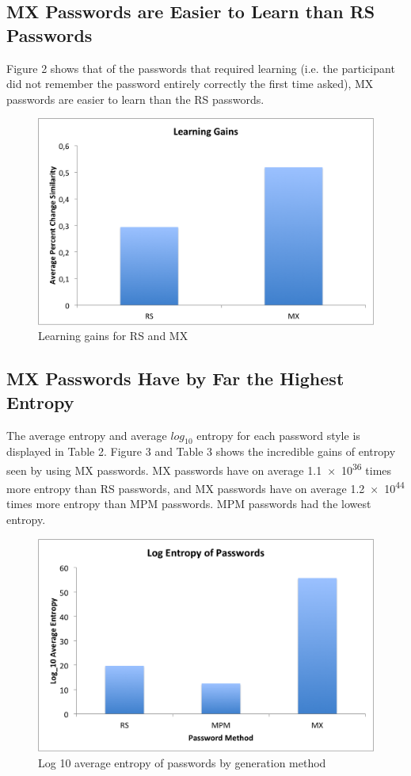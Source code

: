 \documentclass{article}
\begin{document}
\subsection*{MX Passwords are Easier to Learn than RS Passwords}
Figure 2 shows that of the passwords that required learning (i.e. the participant did not remember the password entirely correctly the first time asked), MX passwords are easier to learn than the RS passwords. 
\begin{figure}[h]
\centering
\includegraphics[scale=0.7]{learningGains.png}
\caption{Learning gains for RS and MX}
\end{figure}

\subsection*{MX Passwords Have by Far the Highest Entropy}
The average  entropy and average $log_{10}$ entropy for each password style is displayed in Table 2. Figure 3 and Table 3 shows the incredible gains of entropy seen by using MX passwords. MX passwords have on average \num{1.1e36} times more entropy than RS passwords, and MX passwords have on average \num{1.2e44} times more entropy than MPM passwords. MPM passwords had the lowest entropy. 

\begin{figure}[h]
\centering
\includegraphics[scale=0.7]{entropy.png}
\caption{Log 10 average entropy of passwords by generation method}
\end{figure}
\end{document}

